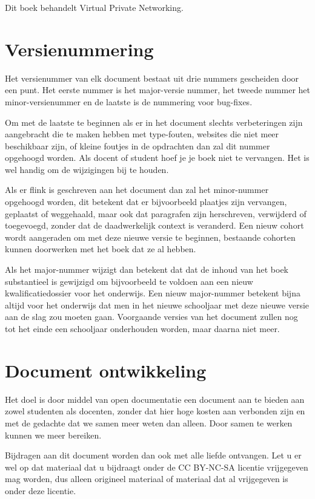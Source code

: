 Dit boek behandelt Virtual Private Networking.

\section*{Versienummering}
Het versienummer van elk document bestaat uit drie nummers gescheiden door een punt. Het eerste nummer is het major-versie nummer, het tweede nummer het minor-versienummer en de laatste is de nummering voor bug-fixes.\par
Om met de laatste te beginnen als er in het document slechts verbeteringen zijn aangebracht die te maken hebben met type-fouten, websites die niet meer beschikbaar zijn, of kleine foutjes in de opdrachten dan zal dit nummer opgehoogd worden. Als docent of student hoef je je boek niet te vervangen. Het is wel handig om de wijzigingen bij te houden.\par
Als er flink is geschreven aan het document dan zal het minor-nummer opgehoogd worden, dit betekent dat er bijvoorbeeld plaatjes zijn vervangen, geplaatst of weggehaald, maar ook dat paragrafen zijn herschreven, verwijderd of toegevoegd, zonder dat de daadwerkelijk context is veranderd. Een nieuw cohort wordt aangeraden om met deze nieuwe versie te beginnen, bestaande cohorten kunnen doorwerken met het boek dat ze al hebben.\par
Als het major-nummer wijzigt dan betekent dat dat de inhoud van het boek substantieel is gewijzigd om bijvoorbeeld te voldoen aan een nieuw kwalificatiedossier voor het onderwijs. Een nieuw major-nummer betekent bijna altijd voor het onderwijs dat men in het nieuwe schooljaar met deze nieuwe versie aan de slag zou moeten gaan. Voorgaande versies van het document zullen nog tot het einde een schooljaar onderhouden worden, maar daarna niet meer.

\section*{Document ontwikkeling}
Het doel is door middel van open documentatie een document aan te bieden aan zowel studenten als docenten, zonder dat hier hoge kosten aan verbonden zijn en met de gedachte dat we samen meer weten dan alleen. Door samen te werken kunnen we meer bereiken.\par
Bijdragen aan dit document worden dan ook met alle liefde ontvangen. Let u er wel op dat materiaal dat u bijdraagt onder de CC BY-NC-SA licentie vrijgegeven mag worden, dus alleen origineel materiaal of materiaal dat al vrijgegeven is onder deze licentie.
